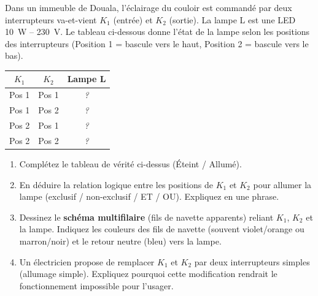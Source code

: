 \documentclass[11pt]{article}
\begin{document}
\begin{exercice}
Dans un immeuble de Douala, l'éclairage du couloir est commandé par deux interrupteurs va-et-vient $K_1$ (entrée) et $K_2$ (sortie). La lampe L est une LED \SI{10}{\watt} -- \SI{230}{\volt}. Le tableau ci-dessous donne l'état de la lampe selon les positions des interrupteurs (Position 1 = bascule vers le haut, Position 2 = bascule vers le bas).

\begin{center}
\begin{tabular}{|c|c|c|}
\hline
$K_1$ & $K_2$ & Lampe L \\
\hline
Pos 1 & Pos 1 & \textit{?} \\
Pos 1 & Pos 2 & \textit{?} \\
Pos 2 & Pos 1 & \textit{?} \\
Pos 2 & Pos 2 & \textit{?} \\
\hline
\end{tabular}
\end{center}

\begin{enumerate}
    \item Complétez le tableau de vérité ci-dessus (Éteint / Allumé).
    \item En déduire la relation logique entre les positions de $K_1$ et $K_2$ pour allumer la lampe (exclusif / non-exclusif / ET / OU). Expliquez en une phrase.
    \item Dessinez le \textbf{schéma multifilaire} (fils de navette apparents) reliant $K_1$, $K_2$ et la lampe. Indiquez les couleurs des fils de navette (souvent violet/orange ou marron/noir) et le retour neutre (bleu) vers la lampe.
    \item Un électricien propose de remplacer $K_1$ et $K_2$ par deux interrupteurs simples (allumage simple). Expliquez pourquoi cette modification rendrait le fonctionnement impossible pour l'usager.
\end{enumerate}
\end{exercice}
\end{document}
